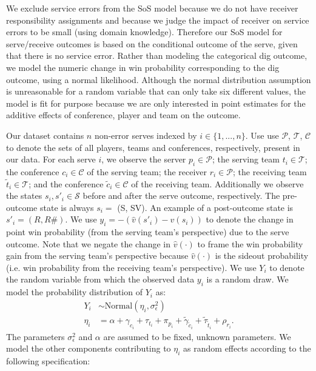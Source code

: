 \documentclass{article}
\begin{document}
We exclude service errors from the SoS model because we do not have receiver responsibility assignments and because we judge the impact of receiver on service errors to be small (using domain knowledge). Therefore our SoS model for serve/receive outcomes is based on the conditional outcome of the serve, given that there is no service error. Rather than modeling the categorical dig outcome, we model the numeric change in win probability corresponding to the dig outcome, using a normal likelihood. Although the normal distribution assumption is unreasonable for a random variable that can only take six different values, the model is fit for purpose because we are only interested in point estimates for the additive effects of conference, player and team on the outcome.

Our dataset contains $n$ non-error serves indexed by $i \in \{1, ..., n\}$. Use use $\mathcal{P}$, $\mathcal{T}$, $\mathcal{C}$ to denote the sets of all players, teams and conferences, respectively, present in our data. For each serve $i$, we observe the server $p_i \in \mathcal{P}$; the serving team $t_i \in \mathcal{T}$; the conference $c_i \in \mathcal{C}$ of the serving team; the receiver $r_i \in \mathcal{P}$; the receiving team $\tilde t_i \in \mathcal{T}$; and the conference $\tilde c_i \in \mathcal{C}$ of the receiving team. Additionally we observe the states $s_i, s'_i \in \mathcal{S}$ before and after the serve outcome, respectively. The pre-outcome state is always $s_i =$ (S, SV). An example of a post-outcome state is $s'_i = (R, R\#)$. We use $y_i = -(\hat v(s'_i) - \hat v(s_i))$ to denote the change in point win probability (from the serving team's perspective) due to the serve outcome. Note that we negate the change in $\hat v(\cdot)$ to frame the win probability gain from the serving team's perspective because $\hat v(\cdot)$ is the sideout probability (i.e. win probability from the receiving team's perspective). We use $Y_i$ to denote the random variable from which the observed data $y_i$ is a random draw. We model the probability distribution of $Y_i$ as:
\begin{align*}
  Y_i &\sim \mbox{Normal}(\eta_i, \sigma^2_\epsilon)\\
  \eta_i &= \alpha + \gamma_{c_i} + \tau_{t_i} + \pi_{p_i} + \tilde\gamma_{\tilde c_i} + \tilde\tau_{\tilde t_i} + \rho_{r_i}.
\end{align*}
The parameters $\sigma^2_\epsilon$ and $\alpha$ are assumed to be fixed, unknown parameters. We model the other components contributing to $\eta_i$ as random effects according to the following specification:
\end{document}
